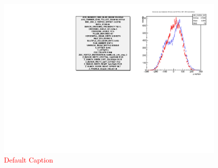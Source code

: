 \begin{figure}
\begin{center}
\includegraphics[width=\linewidth,height=\textheight,keepaspectratio]{./figures/359711_step03_config_compare}
\caption{ \textcolor{red}{Default Caption} }
\label{fig:359711_step03_config_compare}
\end{center}
\end{figure}
